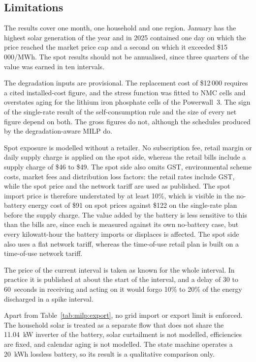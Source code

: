 \subsection{Limitations}
\label{sec:results:limitations}

The results cover one month, one household and one region. January has the highest solar
generation of the year and in 2025 contained one day on which the price reached the
market price cap and a second on which it exceeded \$15\,000/MWh. The spot results should not be annualised, since three quarters of the
value was earned in ten intervals.

The degradation inputs are provisional. The replacement cost of \$12\,000 requires a
cited installed-cost figure, and the stress function was fitted to NMC cells and
overstates aging for the lithium iron phosphate cells of the Powerwall~3. The sign of
the single-rate result of the self-consumption rule and the size of every net figure
depend on both. The
gross figures do not, although the schedules produced by the degradation-aware MILP do.

Spot exposure is modelled without a retailer. No subscription fee, retail margin or
daily supply charge is applied on the spot side, whereas the retail bills include a
supply charge of \$46 to \$49. The spot side also omits GST, environmental scheme
costs, market fees and distribution loss factors: the retail rates include GST, while
the spot price and the network tariff are used as published.
The spot import price is therefore understated by at least 10\%, which is visible in the
no-battery energy cost of \$91 on spot prices against \$122 on the single-rate plan
before the supply charge. The value added by the battery is less sensitive to this than
the bills are, since each is measured against its own no-battery case, but every
kilowatt-hour the battery imports or displaces is affected. The spot side also uses a
flat network tariff, whereas the time-of-use retail plan is built on a time-of-use
network tariff.

The price of the current interval is taken as known for the whole interval. In practice
it is published at about the start of the interval, and a delay of 30 to 60~seconds in
receiving and acting on it would forgo 10\% to 20\% of the energy discharged in a spike
interval.

Apart from Table~\ref{tab:milp:export}, no grid import or export limit is enforced. The
household solar is treated as a separate flow that does not share the 11.04~kW inverter
of the battery, solar curtailment is not modelled, efficiencies are fixed, and calendar
aging is not modelled. The state machine operates a 20~kWh lossless battery, so its
result is a qualitative comparison only.

